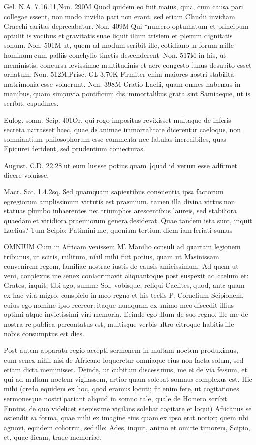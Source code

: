  Gel. N.A. 7.16.11,Non. 290M Quod quidem eo fuit maius, quia, cum causa pari collegae essent, non modo invidia pari non erant, sed etiam Claudii invidiam Gracchi caritas deprecabatur. Non. 409M Qui †numero optumatum et principum optulit is vocibus et gravitatis suae liquit illum tristem et plenum dignitatis sonum. Non. 501M ut, quem ad modum scribit ille, cotidiano in forum mille hominum cum palliis conchylio tinctis descenderent. Non. 517M in his, ut meministis, concursu levissimae multitudinis et aere congesto funus desubito esset ornatum. Non. 512M,Prisc. GL 3.70K Firmiter enim maiores nostri stabilita matrimonia esse voluerunt. Non. 398M Oratio Laelii, quam omnes habemus in manibus, quam simpuvia pontificum dis immortalibus grata sint Samiaeque, ut is scribit, capudines.

 Eulog. somn. Scip. 401Or. qui rogo impositus revixisset multaque de inferis secreta narrasset haec, quae de animae immortalitate dicerentur caeloque, non somniantium philosophorum esse commenta nec fabulas incredibiles, quas Epicurei derident, sed prudentium coniecturas.

 August. C.D. 22.28 ut eum lusisse potius quam †quod id verum esse adfirmet dicere voluisse.

 Macr. Sat. 1.4.2sq. Sed quamquam sapientibus conscientia ipsa factorum egregiorum amplissimum virtutis est praemium, tamen illa divina virtus non statuas plumbo inhaerentes nec triumphos arescentibus laureis, sed stabiliora quaedam et viridiora praemiorum genera desiderat. Quae tandem ista sunt, inquit Laelius? Tum Scipio: Patimini me, quoniam tertium diem iam feriati sumus

 OMNIUM Cum in Africam venissem M'. Manilio consuli ad quartam legionem tribunus, ut scitis, militum, nihil mihi fuit potius, quam ut Masinissam convenirem regem, familiae nostrae iustis de causis amicissimum. Ad quem ut veni, conplexus me senex conlacrimavit aliquantoque post suspexit ad caelum et: Grates, inquit, tibi ago, summe Sol, vobisque, reliqui Caelites, quod, ante quam ex hac vita migro, conspicio in meo regno et his tectis P. Cornelium Scipionem, cuius ego nomine ipso recreor; itaque numquam ex animo meo discedit illius optimi atque invictissimi viri memoria. Deinde ego illum de suo regno, ille me de nostra re publica percontatus est, multisque verbis ultro citroque habitis ille nobis consumptus est dies.

 Post autem apparatu regio accepti sermonem in multam noctem produximus, cum senex nihil nisi de Africano loqueretur omniaque eius non facta solum, sed etiam dicta meminisset. Deinde, ut cubitum discessimus, me et de via fessum, et qui ad multam noctem vigilassem, artior quam solebat somnus complexus est. Hic mihi (credo equidem ex hoc, quod eramus locuti; fit enim fere, ut cogitationes sermonesque nostri pariant aliquid in somno tale, quale de Homero scribit Ennius, de quo videlicet saepissime vigilans solebat cogitare et loqui) Africanus se ostendit ea forma, quae mihi ex imagine eius quam ex ipso erat notior; quem ubi agnovi, equidem cohorrui, sed ille: Ades, inquit, animo et omitte timorem, Scipio, et, quae dicam, trade memoriae.

